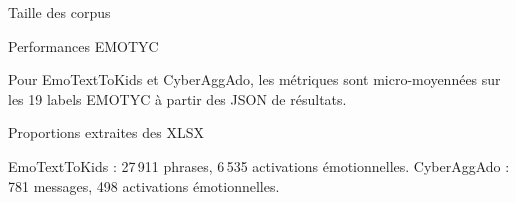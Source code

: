 \documentclass[aspectratio=169,10pt,xcolor=table]{beamer}
\begin{document}
\begin{frame}{Taille des corpus}
\centering
\vspace{1.0em}
\small

\end{frame}

\begin{frame}{Performances EMOTYC}
\centering
\vspace{1.0em}
\small


\vspace{0.6em}
{\footnotesize\color{emotycMuted}Pour EmoTextToKids et CyberAggAdo, les métriques sont micro-moyennées sur les 19 labels EMOTYC à partir des JSON de résultats.}
\end{frame}

\begin{frame}{Proportions extraites des XLSX}
\centering
\scriptsize


\vspace{0.6em}
{\footnotesize\color{emotycMuted}EmoTextToKids : 27\,911 phrases, 6\,535 activations émotionnelles. CyberAggAdo : 781 messages, 498 activations émotionnelles.}
\end{frame}
\end{document}
